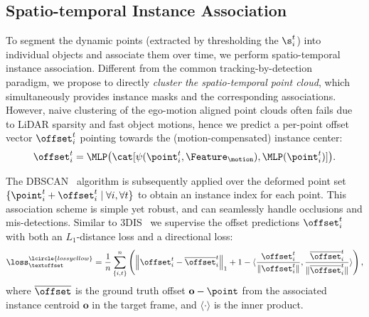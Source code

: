 \subsection{Spatio-temporal Instance Association}
\label{sec:clustering}
To segment the dynamic points (extracted by thresholding the $\s_i^t$) into individual objects and associate them over time, we perform spatio-temporal instance association.
Different from the common tracking-by-detection~\cite{dendorfer2021motchallenge,weng20203d} paradigm, we propose to directly \emph{cluster the spatio-temporal point cloud}, which simultaneously provides instance masks and the corresponding associations.
However, naive clustering of the ego-motion aligned point clouds often fails due to LiDAR sparsity and fast object motions, hence we predict a per-point offset vector $\offset_i^t$ pointing towards %
the (motion-compensated) instance center:
\begin{equation}
    \offset_{i}^t = \MLP\big(\cat[\psi(\point_i^t, \Feature_\motion), \MLP(\point_i^t)]\big).
\end{equation}

The DBSCAN~\cite{ester1996density} algorithm is subsequently applied over the deformed point set $\{\point_i^t + \offset_i^t \; | \; \forall i, \forall t\}$ to obtain an instance index for each point.
This association scheme is simple yet robust, and can seamlessly handle occlusions and mis-detections.
Similar to 3DIS~\cite{lahoud20193d} we supervise the offset predictions $\offset_i^t$ with both an $L_1$-distance loss and a directional
loss:
\begin{equation}
\loss_\textoffset^\lcircle{lossyellow} =\frac{1}{n}  \sum_{\{i,t\}}^n \left( \left\| \offset_i^t  - \overline{\offset}_i^t \right\|_{1} + 1 - \langle \frac{\offset_i^t}{\| \offset_i^t\|}, \frac{\overline{\offset}_i^t}{\| \overline{\offset}_i^t\|} \rangle \right),
\end{equation}
where $\overline{\offset}$ is the ground truth offset $\mathbf{o}-\point$ from the associated instance centroid $\mathbf{o}$ in the target frame, and $\langle \cdot \rangle$ is the inner product.


